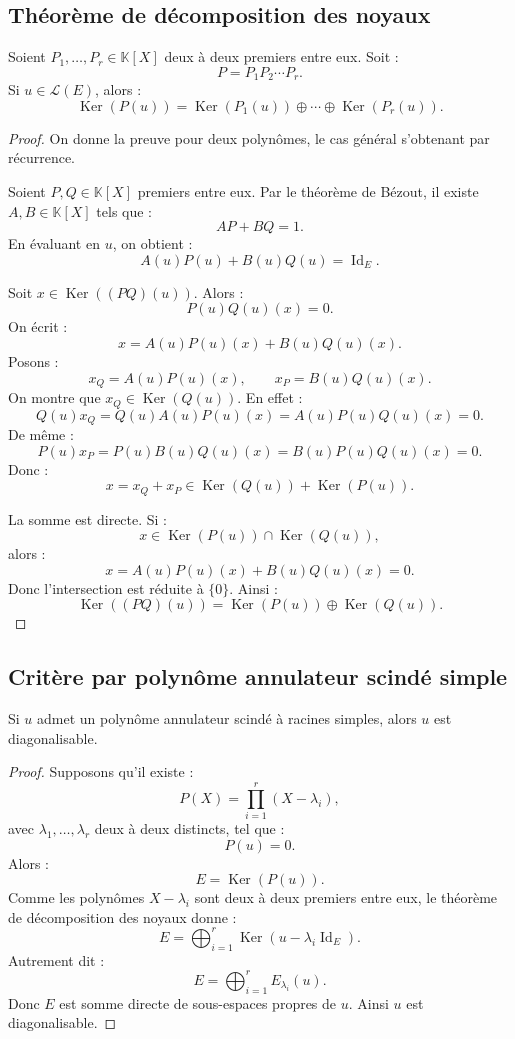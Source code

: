 \documentclass[11pt,a4paper]{article}
\newcommand{\K}{\mathbb K}
\newcommand{\Lcal}{\mathcal L}
\newcommand{\Ker}{\operatorname{Ker}}
\newcommand{\Id}{\operatorname{Id}}
\begin{document}
\subsection{Théorème de décomposition des noyaux}

\begin{theorembox}
Soient \(P_1,\dots,P_r\in\K[X]\) deux à deux premiers entre eux.  
Soit :
\[
P=P_1P_2\cdots P_r.
\]
Si \(u\in\Lcal(E)\), alors :
\[
\Ker(P(u))
=
\Ker(P_1(u))\oplus\cdots\oplus\Ker(P_r(u)).
\]
\end{theorembox}

\begin{proof}
On donne la preuve pour deux polynômes, le cas général s'obtenant par récurrence.

Soient \(P,Q\in\K[X]\) premiers entre eux.  
Par le théorème de Bézout, il existe \(A,B\in\K[X]\) tels que :
\[
AP+BQ=1.
\]
En évaluant en \(u\), on obtient :
\[
A(u)P(u)+B(u)Q(u)=\Id_E.
\]

Soit \(x\in\Ker((PQ)(u))\).  
Alors :
\[
P(u)Q(u)(x)=0.
\]
On écrit :
\[
x=A(u)P(u)(x)+B(u)Q(u)(x).
\]
Posons :
\[
x_Q=A(u)P(u)(x),
\qquad
x_P=B(u)Q(u)(x).
\]
On montre que \(x_Q\in\Ker(Q(u))\).  
En effet :
\[
Q(u)x_Q
=
Q(u)A(u)P(u)(x)
=
A(u)P(u)Q(u)(x)
=
0.
\]
De même :
\[
P(u)x_P
=
P(u)B(u)Q(u)(x)
=
B(u)P(u)Q(u)(x)
=
0.
\]
Donc :
\[
x=x_Q+x_P\in\Ker(Q(u))+\Ker(P(u)).
\]

La somme est directe.  
Si :
\[
x\in\Ker(P(u))\cap\Ker(Q(u)),
\]
alors :
\[
x=A(u)P(u)(x)+B(u)Q(u)(x)=0.
\]
Donc l'intersection est réduite à \(\{0\}\).  
Ainsi :
\[
\Ker((PQ)(u))=\Ker(P(u))\oplus\Ker(Q(u)).
\]
\end{proof}

\subsection{Critère par polynôme annulateur scindé simple}

\begin{theorembox}
Si \(u\) admet un polynôme annulateur scindé à racines simples, alors \(u\) est diagonalisable.
\end{theorembox}

\begin{proof}
Supposons qu'il existe :
\[
P(X)=\prod_{i=1}^r(X-\lambda_i),
\]
avec \(\lambda_1,\dots,\lambda_r\) deux à deux distincts, tel que :
\[
P(u)=0.
\]
Alors :
\[
E=\Ker(P(u)).
\]
Comme les polynômes \(X-\lambda_i\) sont deux à deux premiers entre eux, le théorème de décomposition des noyaux donne :
\[
E=
\bigoplus_{i=1}^r \Ker(u-\lambda_i\Id_E).
\]
Autrement dit :
\[
E=\bigoplus_{i=1}^r E_{\lambda_i}(u).
\]
Donc \(E\) est somme directe de sous-espaces propres de \(u\).  
Ainsi \(u\) est diagonalisable.
\end{proof}
\end{document}
